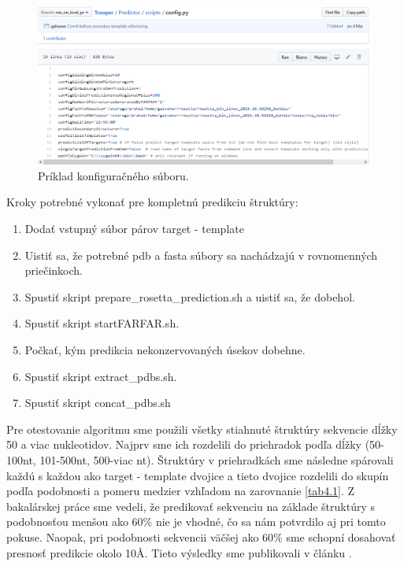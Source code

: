 \begin{figure}%
\includegraphics[width=\textwidth]{../img/config}
\caption{Príklad konfiguračného súboru.}
\label{obr04:config}
\end{figure}


\indent Kroky potrebné vykonať pre kompletnú predikciu štruktúry:
\begin{enumerate}
\item Dodať vstupný súbor párov target - template
\item Uistiť sa, že potrebné pdb a fasta súbory sa nachádzajú v rovnomenných priečinkoch.
\item Spustiť skript prepare\_rosetta\_prediction.sh a uistiť sa, že dobehol.
\item Spustiť skript startFARFAR.sh.
\item Počkať, kým predikcia nekonzervovaných úsekov dobehne.
\item Spustiť skript extract\_pdbs.sh.
\item Spustiť skript concat\_pdbs.sh
\end{enumerate}

\indent Pre otestovanie algoritmu sme použili všetky stiahnuté štruktúry sekvencie dĺžky 50 a viac nukleotidov. Najprv sme ich rozdelili do priehradok podľa dĺžky (50-100nt, 101-500nt, 500-viac nt). Štruktúry v priehradkách sme následne spárovali každú s každou ako target - template dvojice a tieto dvojice rozdelili do skupín podľa podobnosti a pomeru medzier vzhľadom na zarovnanie \ref{tab4.1}. Z bakalárskej práce sme vedeli, že predikovať sekvenciu na základe štruktúry s podobnosťou menšou ako 60\% nie je vhodné, čo sa nám potvrdilo aj pri tomto pokuse. Naopak, pri podobnosti sekvencii väčšej ako 60\% sme schopní dosahovať presnosť predikcie okolo 10Å. Tieto výsledky sme publikovali v článku \cite{7822808}. 

